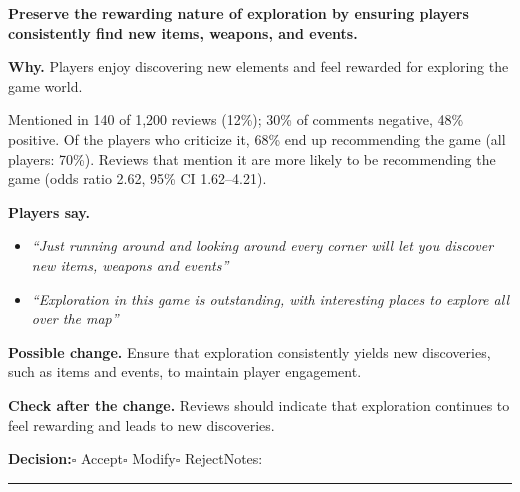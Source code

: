 \documentclass[10pt]{article}
\begin{document}
\begin{tcolorbox}[colback=white,colframe=gP,colbacktitle=lP,coltitle=black,title={\textbf{P4}\quad Exploration and Resource Management\hfill\textcolor{gP}{\textbf{Protect}}},boxrule=0.8pt,arc=2pt,left=6pt,right=6pt,top=4pt,bottom=4pt,before skip=8pt,after skip=8pt]
{\large\textbf{Preserve the rewarding nature of exploration by ensuring players consistently find new items, weapons, and events.}}

\smallskip
\textbf{Why.} Players enjoy discovering new elements and feel rewarded for exploring the game world.

\smallskip
{\small Mentioned in 140 of 1,200 reviews (12\%); 30\% of comments negative, 48\% positive. Of the players who criticize it, 68\% end up recommending the game (all players: 70\%). Reviews that mention it are more likely to be recommending the game {\color{ink2}\footnotesize(odds ratio 2.62, 95\% CI 1.62--4.21)}.}

\smallskip
\textbf{Players say.}
\begin{itemize}[leftmargin=12pt,itemsep=1pt,topsep=2pt]
    \item \textit{``Just running around and looking around every corner will let you discover new items, weapons and events''}
    \item \textit{``Exploration in this game is outstanding, with interesting places to explore all over the map''}
\end{itemize}
\textbf{Possible change.} Ensure that exploration consistently yields new discoveries, such as items and events, to maintain player engagement.

\smallskip
\textbf{Check after the change.} Reviews should indicate that exploration continues to feel rewarding and leads to new discoveries.

\medskip
{\small\textbf{Decision:}\quad $\square$ Accept\quad $\square$ Modify\quad $\square$ Reject\qquad Notes: \rule{0.38\linewidth}{0.4pt}}
\end{tcolorbox}
\end{document}
